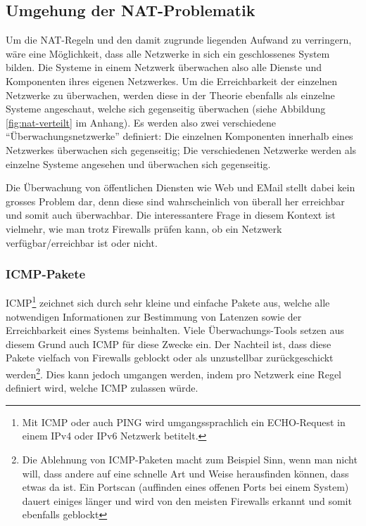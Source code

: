 \subsection{Umgehung der NAT-Problematik} \label{sec:theorie-nat-fazit}
Um die NAT-Regeln und den damit zugrunde liegenden Aufwand zu verringern, w\"are eine M\"oglichkeit, dass alle Netzwerke in sich ein geschlossenes System bilden. Die Systeme in einem Netzwerk \"uberwachen also alle Dienste und Komponenten ihres eigenen Netzwerkes. Um die Erreichbarkeit der einzelnen Netzwerke zu \"uberwachen, werden diese in der Theorie ebenfalls als einzelne Systeme angeschaut, welche sich gegenseitig \"uberwachen (siehe Abbildung \ref{fig:nat-verteilt} im Anhang). Es werden also zwei verschiedene "`\"Uberwachungsnetzwerke"' definiert: Die einzelnen Komponenten innerhalb eines Netzwerkes \"uberwachen sich gegenseitig; Die verschiedenen Netzwerke werden als einzelne Systeme angesehen und \"uberwachen sich gegenseitig.

Die \"Uberwachung von \"offentlichen Diensten wie Web und EMail stellt dabei kein grosses Problem dar, denn diese sind wahrscheinlich von \"uberall her erreichbar und somit auch \"uberwachbar. Die interessantere Frage in diesem Kontext ist vielmehr, wie man trotz Firewalls pr\"ufen kann, ob ein Netzwerk verf\"ugbar/erreichbar ist oder nicht.

\subsubsection{ICMP-Pakete} \label{sec:theorie-nat-fazit-icmp} 
ICMP\cite{rfc792}\footnote{Mit ICMP oder auch PING wird umgangssprachlich ein ECHO-Request in einem IPv4 oder IPv6 Netzwerk betitelt.} zeichnet sich durch sehr kleine und einfache Pakete aus, welche alle notwendigen Informationen zur Bestimmung von Latenzen sowie der Erreichbarkeit eines Systems beinhalten. Viele \"Uberwachungs-Tools setzen aus diesem Grund auch ICMP f\"ur diese Zwecke ein. Der Nachteil ist, dass diese Pakete vielfach von Firewalls geblockt oder als unzustellbar zur\"uckgeschickt werden\footnote{\label{foot:theorie-verteilt-icmp}Die Ablehnung von ICMP-Paketen macht zum Beispiel Sinn, wenn man nicht will, dass andere auf eine schnelle Art und Weise herausfinden k\"onnen, dass etwas da ist. Ein Portscan (auffinden eines offenen Ports bei einem System) dauert einiges l\"anger und wird von den meisten Firewalls erkannt und somit ebenfalls geblockt}. Dies kann jedoch umgangen werden, indem pro Netzwerk eine Regel definiert wird, welche ICMP zulassen w\"urde.

